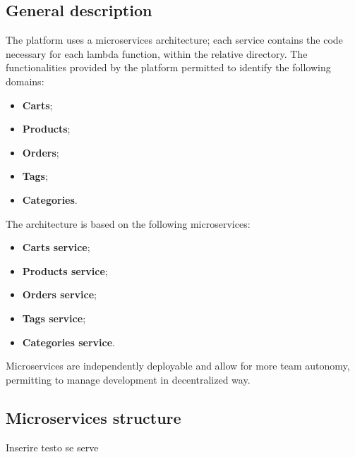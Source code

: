 \subsection{General description}
The platform uses a microservices architecture; each service contains the code necessary for each lambda function, within the relative directory.
The functionalities provided by the platform permitted to identify the following domains:
\begin{itemize}
    \item \textbf{Carts};
    \item \textbf{Products};
    \item \textbf{Orders};
    \item \textbf{Tags};
    \item \textbf{Categories}.
\end{itemize}
The architecture is based on the following microservices:
\begin{itemize}
    \item \textbf{Carts service};
    \item \textbf{Products service};
    \item \textbf{Orders service};
    \item \textbf{Tags service};
    \item \textbf{Categories service}.
\end{itemize}
Microservices are independently deployable and allow for more team autonomy, permitting to manage development in decentralized way.
\pagebreak
\subsection{Microservices structure}
Inserire testo se serve
